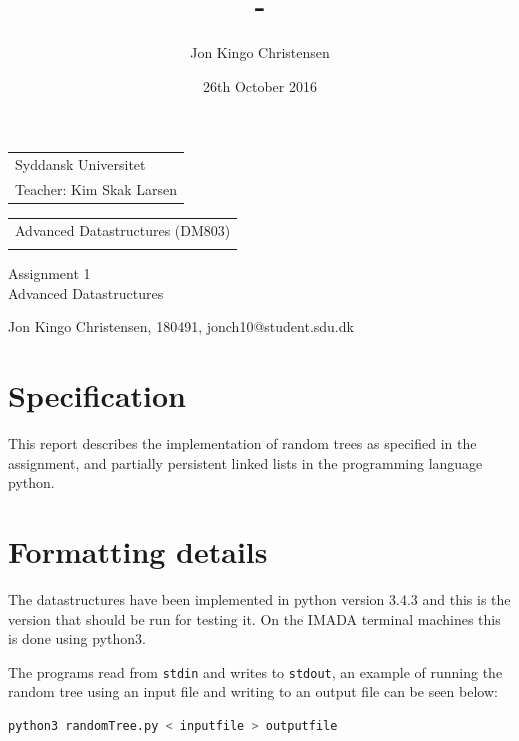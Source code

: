 \documentclass[12pt, a4paper]{article}
\date{26th October 2016}
\author{Jon Kingo Christensen}
\title{\papertitle{} - \papersubtitle{}}
\makeatletter
\def\identification{Jon Kingo Christensen, 180491, jonch10@student.sdu.dk}
\def\courseCode{DM803}
\def\courseTitle{Advanced Datastructures}
\def\lectorLabel{Teacher:}
\def\lector{Kim Skak Larsen}
\def\universityName{Syddansk Universitet}
\def\papertitle{Assignment 1}
\def\papersubtitle{\courseTitle}
\makeatother
\begin{document}

\begin{tabular}{@{}l}
\universityName{} \\
\lectorLabel{} \lector{}
\end{tabular}
\hfill
\begin{tabular}{r@{}}
\courseTitle{} (\courseCode{}) \\
\thedate{}
\end{tabular}

\bigskip

\begin{center}
    \Huge{\papertitle{}} \\
    \Large{\papersubtitle{}}
\end{center}
\normalsize{}

\begin{center}
    \identification{}
\end{center}






\section*{Specification}
This report describes the implementation of random trees as specified in the
assignment,
and partially persistent linked lists in the programming language python.


\section*{Formatting details}
The datastructures have been implemented in python version 3.4.3 and this is the version that should be run for testing it.
On the IMADA terminal machines this is done using python3.

\medskip

The programs read from \texttt{stdin} and writes to \texttt{stdout}, an example of running the random tree using an input file and writing
to an output file can be seen below:
\begin{lstlisting}[language=bash]
  python3 randomTree.py < inputfile > outputfile
\end{lstlisting}
\end{document}
